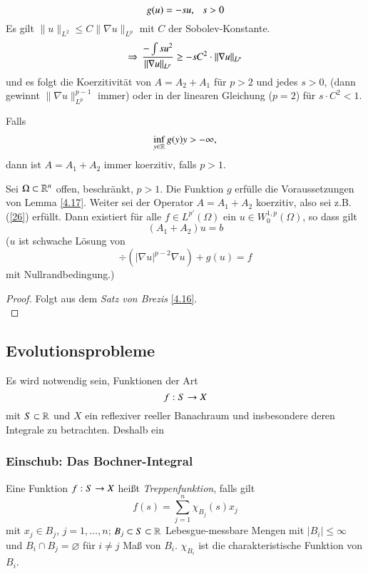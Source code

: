 \begin{beispiel}
\[
    g(u)=-su, \hspace{.25cm} s>0
\]
Es gilt $\|u\|_{L^2}\leq C\| \nabla u\|_{L^p}$ mit $C$ der Sobolev-Konstante.
\[
    \Rightarrow \, \frac{-\int su^2}{\|\nabla u\|_{L^p}} \geq -s C^2 \cdot\|\nabla u\|_{L^p}
\]
und es folgt die Koerzitivität von $A=A_2+A_1$ für $p>2$ und jedes $s>0$, (dann gewinnt $\|\nabla u \|
_{L^p}^{p-1}$ immer) oder in der linearen Gleichung ($p=2$) für $s\cdot C^2<1$.
\end{beispiel}

\begin{beispiel}
Falls
\begin{align}\label{26}
    \inf_{y\in \mathbb{R}} g(y) y> -\infty,
\end{align}
dann ist $A=A_1+A_2$ immer koerzitiv, falls $p>1$.
\end{beispiel}

\begin{theorem}\label{4.18}
    Sei $\Omega \subset\mathbb{R}^n$ offen, beschränkt, $p>1$. Die Funktion $g$ erfülle die Voraussetzungen von
    Lemma \ref{4.17}. Weiter sei der Operator $A=A_1+A_2$ koerzitiv, also sei z.B. (\ref{26}) erfüllt.
    Dann existiert für alle $f\in L^{p'}(\Omega)$ ein $u\in W_0^{1,p}(\Omega)$, so dass gilt
    \[
        (A_1+A_2)u=b
    \]
    ($u$ ist schwache Lösung von 
     \[
        \div(|\nabla u|^{p-2}\nabla u)+ g(u)=f
     \]
     mit Nullrandbedingung.)
\end{theorem}

\begin{proof}
    Folgt aus dem \textit{Satz von Brezis} \ref{4.16}. \[ \]
\end{proof}

\subsection{Evolutionsprobleme}

Es wird notwendig sein, Funktionen der Art
\[
    f:S\rightarrow X
\]
mit $S\subset \mathbb{R}$ und $X$ ein reflexiver reeller Banachraum und insbesondere deren Integrale zu
betrachten. Deshalb ein 

\subsubsection*{Einschub: Das Bochner-Integral}

\begin{defi}[Treppenfunktion]\label{4.19}
    Eine Funktion $f:S\rightarrow X$ heißt \textit{Treppenfunktion}, falls gilt
    \[
        f(s)=\sum_{j=1}^n \chi_{B_j} (s) x_j
    \]
    mit $x_j\in B_j$, $j=1,…,n$; $B_j\subset S \subset \mathbb{R}$ Lebesgue-messbare Mengen mit
    $|B_i|\leq \infty$ und $B_i\cap B_j=\varnothing$ für $i\neq j$ Maß von $B_i$. $\chi_{B_i}$ ist
    die charakteristische Funktion von $B_i$.    
\end{defi}

